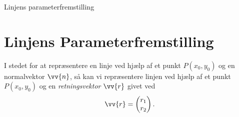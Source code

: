 \begin{center}
\Huge
Linjens parameterfremstilling
\end{center}

\section*{Linjens Parameterfremstilling}

I stedet for at repræsentere en linje ved hjælp af et punkt $P(x_0,y_0)$ og en normalvektor $\vv{n}$, så kan vi repræsentere linjen ved hjælp af et punkt $P(x_0,y_0)$ og en \textit{retningsvektor} $\vv{r}$ givet ved 
\begin{align*}
	\vv{r} = 	
	\begin{pmatrix}
 		r_1 \\ r_2
	\end{pmatrix}.
\end{align*}

